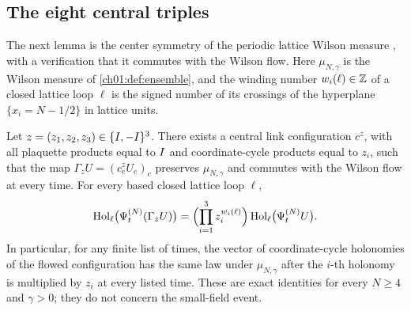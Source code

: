\subsection{The eight central triples}

The next lemma is the center symmetry of the periodic lattice Wilson measure \cite{Hooft1979}, with a verification that it commutes with the Wilson flow. Here $\mu_{N,\gamma}$ is the Wilson measure of \cref{ch01:def:ensemble}, and the winding number $w_i(\ell)\in\mathbb Z$ of a closed lattice loop $\ell$ is the signed number of its crossings of the hyperplane $\{x_i=N-1/2\}$ in lattice units.

\begin{lemma}\label{ch32:lem:finite-center-invariance}
Let $z=(z_1,z_2,z_3)\in\{I,-I\}^3$. There exists a central link configuration $c^z$, with all plaquette products equal to $I$ and coordinate-cycle products equal to $z_i$, such that the map $\Gamma_zU=(c^z_eU_e)_e$ preserves $\mu_{N,\gamma}$ and commutes with the Wilson flow at every time. For every based closed lattice loop $\ell$,
\[
 \operatorname{Hol}_\ell\bigl(\Psi^{(N)}_t(\Gamma_zU)\bigr)=\Bigl(\prod_{i=1}^3z_i^{w_i(\ell)}\Bigr)\operatorname{Hol}_\ell\bigl(\Psi^{(N)}_tU\bigr).
\]
In particular, for any finite list of times, the vector of coordinate-cycle holonomies of the flowed configuration has the same law under $\mu_{N,\gamma}$ after the $i$-th holonomy is multiplied by $z_i$ at every listed time. These are exact identities for every $N\ge4$ and $\gamma>0$; they do not concern the small-field event.
\end{lemma}

